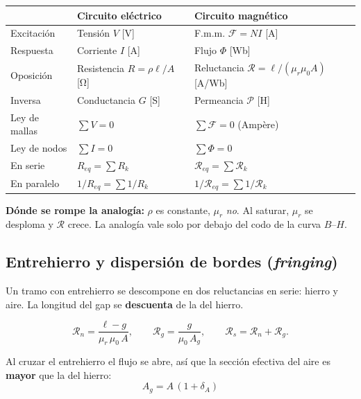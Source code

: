 \documentclass[11pt,a4paper]{article}
\newcommand{\mur}{\mu_r}
\newcommand{\muz}{\mu_0}
\newcommand{\Rel}{\mathcal{R}}          %
\newcommand{\fmm}{\mathcal{F}}          %
\newcommand{\Av}{\unit{\ampere}\text{-vuelta}}
\begin{document}
\begin{table}[h]
\centering
\begin{tabular}{@{}lll@{}}
\toprule
& \textbf{Circuito eléctrico} & \textbf{Circuito magnético} \\
\midrule
Excitación   & Tensión $V$ \hfill [\unit{\volt}]      & F.m.m. $\fmm = NI$ \hfill [\Av] \\
Respuesta    & Corriente $I$ \hfill [\unit{\ampere}]  & Flujo $\Phi$ \hfill [\unit{\weber}] \\
Oposición    & Resistencia $R = \rho\ell/A$ \hfill [\unit{\ohm}] & Reluctancia $\Rel = \ell/(\mur\muz A)$ \hfill [\Av/\unit{\weber}] \\
Inversa      & Conductancia $G$ \hfill [\unit{\siemens}] & Permeancia $\mathcal{P}$ \hfill [\unit{\henry}] \\
Ley de mallas& $\sum V = 0$                           & $\sum \fmm = 0$ (Ampère) \\
Ley de nodos & $\sum I = 0$                           & $\sum \Phi = 0$ \\
En serie     & $R_{eq} = \sum R_k$                    & $\Rel_{eq} = \sum \Rel_k$ \\
En paralelo  & $1/R_{eq} = \sum 1/R_k$                & $1/\Rel_{eq} = \sum 1/\Rel_k$ \\
\bottomrule
\end{tabular}
\end{table}

\noindent \textbf{Dónde se rompe la analogía:} $\rho$ es constante, $\mur$ \emph{no}.
Al saturar, $\mur$ se desploma y $\Rel$ crece. La analogía vale solo por debajo del codo
de la curva $B$--$H$.

\subsection{Entrehierro y dispersión de bordes (\emph{fringing})}

Un tramo con entrehierro se descompone en dos reluctancias en serie: hierro y aire.
La longitud del gap se \textbf{descuenta} de la del hierro.

\begin{equation}
  \Rel_n = \frac{\ell - g}{\mur\,\muz\,A},
  \qquad
  \Rel_g = \frac{g}{\muz\,A_g},
  \qquad
  \Rel_s = \Rel_n + \Rel_g .
\end{equation}

Al cruzar el entrehierro el flujo se abre, así que la sección efectiva del aire es
\textbf{mayor} que la del hierro:
\begin{equation}
  \boxed{\ A_g = A\,(1 + \delta_A) \ }
\end{equation}
\end{document}
